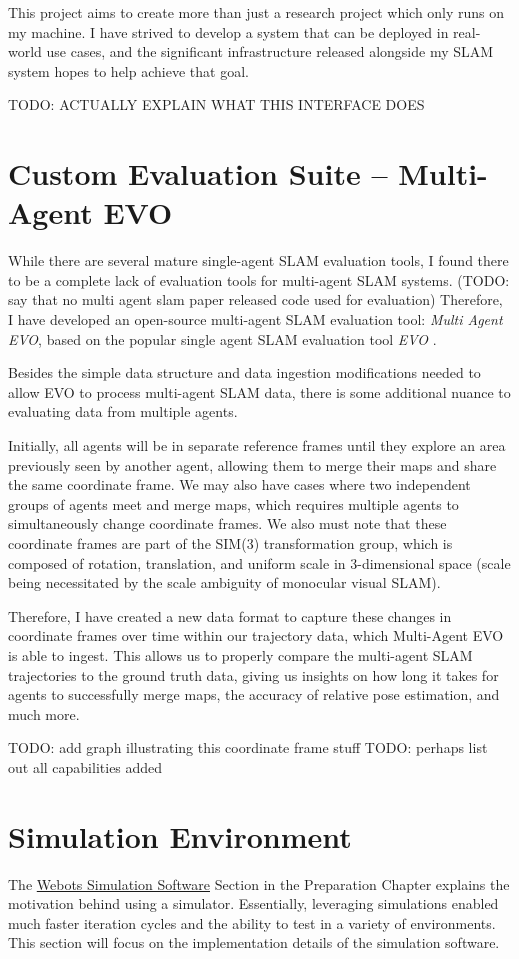 This project aims to create more than just a research project which only runs on my machine. I have strived to develop a system that can be deployed in real-world use cases, and the significant infrastructure released alongside my SLAM system hopes to help achieve that goal.

TODO: ACTUALLY EXPLAIN WHAT THIS INTERFACE DOES

\section{Custom Evaluation Suite – Multi-Agent EVO}
\label{sec:multi-agent-evo}
While there are several mature single-agent SLAM evaluation tools, I found there to be a complete lack of evaluation tools for multi-agent SLAM systems. (TODO: say that no multi agent slam paper released code used for evaluation) Therefore, I have developed an open-source multi-agent SLAM evaluation tool: \textit{Multi Agent EVO}, based on the popular single agent SLAM evaluation tool \textit{EVO} \autocite{grupp2017evo}.

Besides the simple data structure and data ingestion modifications needed to allow EVO to process multi-agent SLAM data, there is some additional nuance to evaluating data from multiple agents.

Initially, all agents will be in separate reference frames until they explore an area previously seen by another agent, allowing them to merge their maps and share the same coordinate frame. We may also have cases where two independent groups of agents meet and merge maps, which requires multiple agents to simultaneously change coordinate frames. We also must note that these coordinate frames are part of the SIM(3) transformation group, which is composed of rotation, translation, and uniform scale in 3-dimensional space (scale being necessitated by the scale ambiguity of monocular visual SLAM).

Therefore, I have created a new data format to capture these changes in coordinate frames over time within our trajectory data, which Multi-Agent EVO is able to ingest. This allows us to properly compare the multi-agent SLAM trajectories to the ground truth data, giving us insights on how long it takes for agents to successfully merge maps, the accuracy of relative pose estimation, and much more.

TODO: add graph illustrating this coordinate frame stuff
TODO: perhaps list out all capabilities added

\section{Simulation Environment}
\label{sec:simulation-environment}
The \hyperref[sec:webots-simulator]{Webots Simulation Software} Section in the Preparation Chapter explains the motivation behind using a simulator. Essentially, leveraging simulations enabled much faster iteration cycles and the ability to test in a variety of environments. This section will focus on the implementation details of the simulation software.

